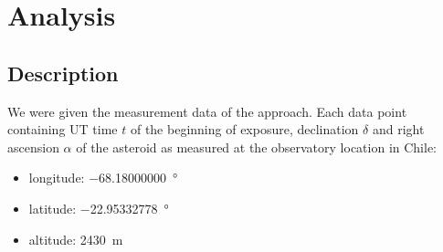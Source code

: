 \documentclass[11pt, a4paper]{article}
\numberwithin{equation}{section}
\begin{document}
\section{Analysis}

\subsection{Description}
We were given the measurement data of the approach.
Each data point containing UT time $t$ of the beginning of exposure, declination $\delta$ and right ascension $\alpha$ of the asteroid as measured at the observatory location in Chile: 
\begin{itemize}
	\item longitude: \SI{-68.18000000}{\degree}
	\item latitude: \SI{-22.95332778}{\degree}
	\item altitude: \SI{2430}{\meter}
\end{itemize}
\end{document}
